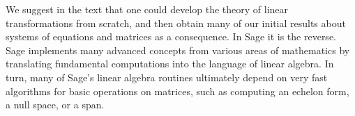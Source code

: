 %
We suggest in the text that one could develop the theory of linear transformations from scratch, and then obtain many of our initial results about systems of equations and matrices as a consequence.  In Sage it is the reverse.  Sage implements many advanced concepts from various areas of mathematics by translating fundamental computations into the language of linear algebra.  In turn, many of Sage's linear algebra routines ultimately depend on very fast algorithms for basic operations on matrices, such as computing an echelon form, a null space, or a span.
%
\begin{sageverbatim}
\end{sageverbatim}
%
